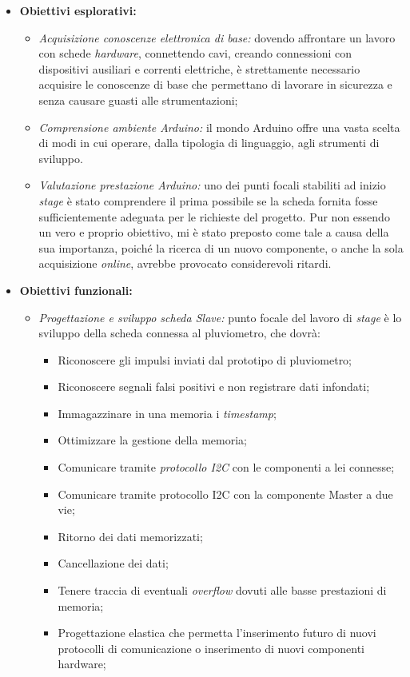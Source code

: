 \begin{itemize}

	\item \textbf{Obiettivi esplorativi:}
	\begin{itemize}
	
		\item \textit{Acquisizione conoscenze elettronica di base:} dovendo affrontare un lavoro con schede \textit{hardware}, connettendo cavi, creando connessioni con dispositivi ausiliari e correnti elettriche, è strettamente necessario acquisire le conoscenze di base che permettano di lavorare in sicurezza e senza causare guasti alle strumentazioni;
		\item \textit{Comprensione ambiente Arduino:} il mondo Arduino offre una vasta scelta di modi in cui operare, dalla tipologia di linguaggio, agli strumenti di sviluppo. 
		\item \textit{Valutazione prestazione Arduino:} uno dei punti focali stabiliti ad inizio \textit{stage} è stato comprendere il prima possibile se la scheda fornita fosse sufficientemente adeguata per le richieste del progetto. Pur non essendo un vero e proprio obiettivo, mi è stato preposto come tale a causa della sua importanza, poiché la ricerca di un nuovo componente, o anche la sola acquisizione \textit{online}, avrebbe provocato considerevoli ritardi.
	
	\end{itemize}
	\item \textbf{Obiettivi funzionali:}
		\begin{itemize}
			\item \textit{Progettazione e sviluppo scheda Slave:} punto focale del lavoro di \textit{stage} è lo sviluppo della scheda connessa al pluviometro, che dovrà:
			\begin{itemize}
				\item Riconoscere gli impulsi inviati dal prototipo di pluviometro;
				\item Riconoscere segnali falsi positivi e non registrare dati infondati;
				\item Immagazzinare in una memoria i \textit{timestamp};
				\item Ottimizzare la gestione della memoria;
				\item Comunicare tramite \textit{protocollo I2C} con le componenti a lei connesse;
				\item Comunicare tramite protocollo I2C con la componente Master a due vie;
				\item Ritorno dei dati memorizzati;
				\item Cancellazione dei dati;
				\item Tenere traccia di eventuali \textit{overflow} dovuti alle basse prestazioni di memoria;
				\item Progettazione elastica che permetta l'inserimento futuro di nuovi protocolli di comunicazione o inserimento di nuovi componenti hardware;


\end{itemize}
\end{itemize}
\end{itemize}
